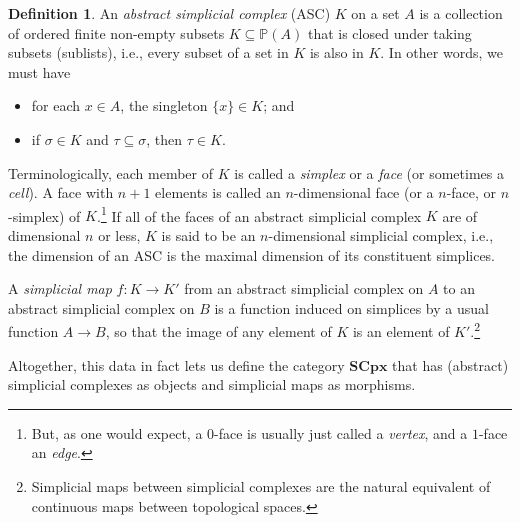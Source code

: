 \documentclass[a4paper]{book}
\theoremstyle{definition}
\theoremstyle{definition}
\newtheorem{definition}{Definition}[section]
\theoremstyle{definition}
\theoremstyle{theorem}
\theoremstyle{definition}
\begin{document}
	\begin{definition}
		An \textit{abstract simplicial complex} (ASC) $K$ on a set $A$ is a collection of ordered finite non-empty subsets $K \subseteq  \mathbb{P}(A)$ that is closed under taking subsets (sublists), i.e., every subset of a set in $K$ is also in $K$. In other words, we must have 
		\begin{itemize}
			\item for each $x \in A$, the singleton $\{x\} \in K$; and 
			\item if $\sigma \in K$ and $\tau \subseteq  \sigma$, then $\tau \in K$. 
		\end{itemize}\par \noindent 
		Terminologically, each member of $K$ is called a \textit{simplex} or a \textit{face} (or sometimes a \textit{cell}). A face with $n+1$ elements is called an $n$-dimensional face (or a $n$-face, or $n$-simplex) of $K$.\footnote{But, as one would expect, a $0$-face is usually just called a \textit{vertex}, and a $1$-face an \textit{edge}.} If all of the faces of an abstract simplicial complex $K$ are of dimensional $n$ or less, $K$ is said to be an $n$-dimensional simplicial complex, i.e., the dimension of an ASC is the maximal dimension of its constituent simplices.\par
		A \textit{simplicial map} $f: K \rightarrow K'$ from an abstract simplicial complex on $A$ to an abstract simplicial complex on $B$ is a function induced on simplices by a usual function $A \rightarrow B$, so that the image of any element of $K$ is an element of $K'$.\footnote{Simplicial maps between simplicial complexes are the natural equivalent of continuous maps between topological spaces.} \par 
		Altogether, this data in fact lets us define the category $\textbf{SCpx}$ that has (abstract) simplicial complexes as objects and simplicial maps as morphisms.
	\end{definition} 
\end{document}
